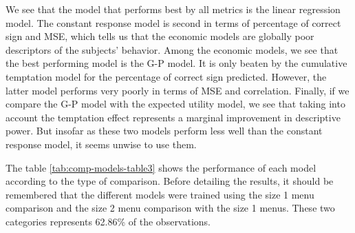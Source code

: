 \documentclass[
]{book}
\begin{document}
We see that the model that performs best by all metrics is the linear regression
model.
The constant response model is second in terms of percentage of correct sign and
MSE, which tells us that the economic models are globally poor descriptors of
the subjects' behavior.
Among the economic models, we see that the best performing model is the G-P
model.
It is only beaten by the cumulative temptation model for the percentage of
correct sign predicted.
However, the latter model performs very poorly in terms of MSE and correlation.
Finally, if we compare the G-P model with the expected utility model, we see
that taking into account the temptation effect represents a marginal improvement
in descriptive power.
But insofar as these two models perform less well than the constant response
model, it seems unwise to use them.

The table \ref{tab:comp-models-table3} shows the performance of each model according to the type of
comparison.
Before detailing the results, it should be remembered that the different models
were trained using the size 1 menu comparison and the size 2 menu comparison
with the size 1 menus.
These two categories represents 62.86\% of the observations.
\end{document}
